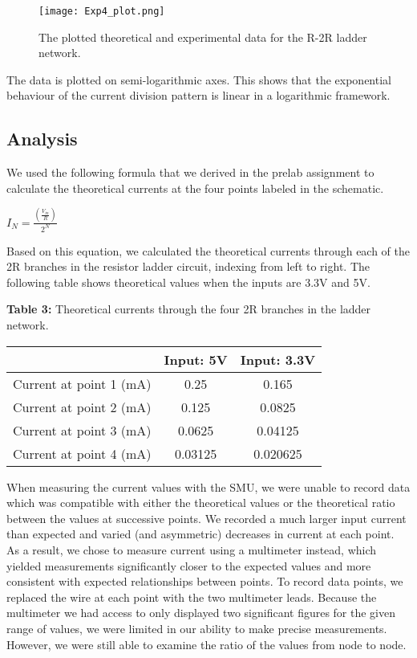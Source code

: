 \documentclass{article}
\begin{document}
\begin{figure}[H]
    \centering
    \texttt{[image: Exp4\_plot.png]}
    \caption{The plotted theoretical and experimental data for the R-2R ladder network.} \label{exp4}
    \label{fig:ramp}
\end{figure}

The data is plotted on semi-logarithmic axes. This shows that the exponential behaviour of the current division pattern is linear in a logarithmic framework.

\subsection{Analysis}
We used the following formula that we derived in the prelab assignment to calculate the theoretical currents at the four points labeled in the schematic. 

\begin{center}
    $I_N = \frac{(\frac{V_{in}}{R})}{2^{N}}$
\end{center}

Based on this equation, we calculated the theoretical currents through each of the 2R branches in the resistor ladder circuit, indexing from left to right. The following table shows theoretical values when the inputs are 3.3V and 5V.

\begin{center}
\textbf{Table 3:} Theoretical currents through the four 2R branches in the ladder network.
\small\addtolength{\tabcolsep}{-5pt}
    \begin{tabular}{|c|c|c|}
        \hline
          & Input: 5V & Input: 3.3V \\ \hline
        Current at point 1 (mA) & 0.25 & 0.165\\ \hline
        Current at point 2 (mA) & 0.125 & 0.0825\\ \hline
        Current at point 3 (mA) & 0.0625 & 0.04125\\ \hline
        Current at point 4 (mA) & 0.03125 & 0.020625\\ \hline
    \end{tabular}
\end{center}

When measuring the current values with the SMU, we were unable to record data which was compatible with either the theoretical values or the theoretical ratio between the values at successive points. We recorded a much larger input current than expected and varied (and asymmetric) decreases in current at each point. As a result, we chose to measure current using a multimeter instead, which yielded measurements significantly closer to the expected values and more consistent with expected relationships between points. To record data points, we replaced the wire at each point with the two multimeter leads. 
Because the multimeter we had access to only displayed two significant figures for the given range of values, we were limited in our ability to make precise measurements. However, we were still able to examine the ratio of the values from node to node. 
\end{document}
